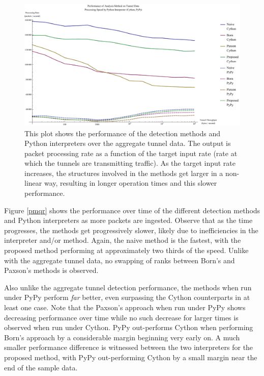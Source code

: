 \documentclass[12pt]{report}
\theoremstyle{remark}
\theoremstyle{definition}
\theoremstyle{definition}
\theoremstyle{definition}
\begin{document}
\begin{figure}
\centering
\includegraphics[width=\textwidth]{figures/pmat.pdf}
\caption[Performance of Analysis Method and Python Interpreter on Aggregate
Tunnel Data]{This plot shows the performance of the detection methods and Python
interpreters over the aggregate tunnel data. The output is packet processing
rate as a function of the target input rate (rate at which the tunnels are
transmitting traffic). As the target input rate increases, the structures
involved in the methods get larger in a non-linear way, resulting in longer
operation times and this slower performance.}
\label{pmat}
\end{figure}

Figure \ref{pmqr} shows the performance over time of the different detection
methods and Python interpreters as more packets are ingested. Observe that as
the time progresses, the methods get progressively slower, likely due to
inefficiencies in the interpreter and/or method. Again, the naive method is the
fastest, with the proposed method performing at approximately two thirds of the
speed. Unlike with the aggregate tunnel data, no swapping of ranks between
Born's and Paxson's methods is observed.

Also unlike the aggregate tunnel detection performance, the methods when run
under PyPy perform \emph{far} better, even surpassing the Cython counterparts in
at least one case. Note that the Paxson's approach when run under PyPy shows
decreasing performance over time while no such decrease for larger times is
observed when run under Cython. PyPy out-performs Cython when performing Born's
approach by a considerable margin beginning very early on. A much smaller
performance difference is witnessed between the two interpreters for the
proposed method, with PyPy out-performing Cython by a small margin near the end
of the sample data.
\end{document}
